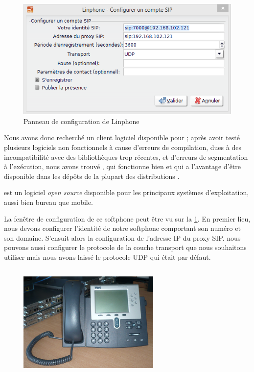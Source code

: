 \subsection{\lnp}

\begin{figure}[h]
\begin{center}
\includegraphics[width=12cm]{images/config-linphone.png}
\end{center}
\caption{Panneau de configuration de Linphone}
\label{conflinphone}
\end{figure}

Nous avons donc recherché un client logiciel disponible pour {\lnx} ; après avoir testé plusieurs logiciels non fonctionnels à cause d’erreurs de compilation, dues à des incompatibilité avec des bibliothèques trop récentes, et d’erreurs de segmentation à l’exécution, nous avons trouvé {\lnp}, qui fonctionne bien et qui a l’avantage d’être disponible dans les dépôts de la plupart des distributions {\lnx}.

{\lnp} est un logiciel \textit{open source} disponible pour les principaux systèmes d’exploitation, aussi bien bureau que mobile.

La fenêtre de configuration de ce softphone peut être vu sur la \cref{conflinphone}. En premier lieu, nous devons configurer l'identité de notre softphone comportant son numéro et son domaine. S'ensuit alors la configuration de l'adresse IP du proxy SIP. nous pouvons aussi configurer le protocole de la couche transport que nous souhaitons utiliser mais nous avons laissé le protocole UDP qui était par défaut.  

\subsection{\cph}

\begin{figure}[H]
\begin{center}
\includegraphics[width=7cm]{images/7961.jpg}
\end{center}
\caption{\cph}
\end{figure}


